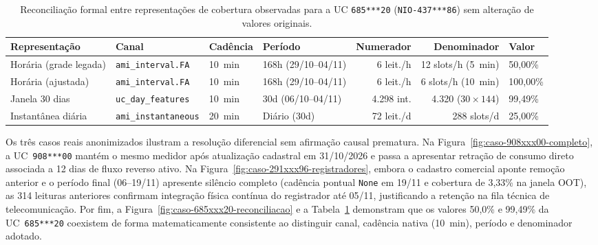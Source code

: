 \begin{table}[htbp]
  \centering
  \caption{Reconciliação formal entre representações de cobertura observadas para a UC \texttt{685***20} (\texttt{NIO-437***86}) sem alteração de valores originais.}
  \label{tab:reconciliacao-uc-685xxx20}
  \small
  \begin{tabular}{llllrrl}
    \toprule
    \textbf{Representação} & \textbf{Canal} & \textbf{Cadência} & \textbf{Período} & \textbf{Numerador} & \textbf{Denominador} & \textbf{Valor} \\
    \midrule
    Horária (grade legada) & \texttt{ami\_interval.FA} & 10~min & 168h (29/10--04/11) & 6 leit./h & 12 slots/h (5~min) & 50,00\% \\
    Horária (ajustada) & \texttt{ami\_interval.FA} & 10~min & 168h (29/10--04/11) & 6 leit./h & 6 slots/h (10~min) & 100,00\% \\
    Janela 30 dias & \texttt{uc\_day\_features} & 10~min & 30d (06/10--04/11) & 4.298 int. & 4.320 ($30\times 144$) & 99,49\% \\
    Instantânea diária & \texttt{ami\_instantaneous} & 20~min & Diário (30d) & 72 leit./d & 288 slots/d & 25,00\% \\
    \bottomrule
  \end{tabular}
\end{table}

Os três casos reais anonimizados ilustram a resolução diferencial sem afirmação causal prematura. Na Figura~\ref{fig:caso-908xxx00-completo}, a UC~\texttt{908***00} mantém o mesmo medidor após atualização cadastral em 31/10/2026 e passa a apresentar retração de consumo direto associada a 12 dias de fluxo reverso ativo. Na Figura~\ref{fig:caso-291xxx96-registradores}, embora o cadastro comercial aponte remoção anterior e o período final (06--19/11) apresente silêncio completo (cadência pontual \texttt{None} em 19/11 e cobertura de 3,33\% na janela OOT), as 314 leituras anteriores confirmam integração física contínua do registrador até 05/11, justificando a retenção na fila técnica de telecomunicação. Por fim, a Figura~\ref{fig:caso-685xxx20-reconciliacao} e a Tabela~\ref{tab:reconciliacao-uc-685xxx20} demonstram que os valores 50,0\% e 99,49\% da UC~\texttt{685***20} coexistem de forma matematicamente consistente ao distinguir canal, cadência nativa (10~min), período e denominador adotado.
